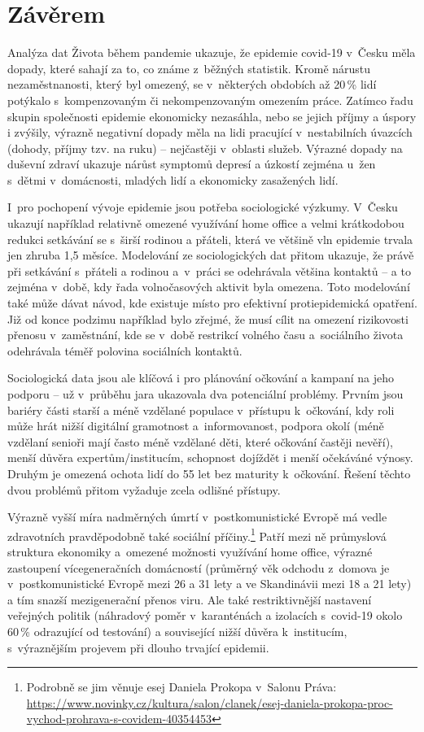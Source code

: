 \section*{Závěrem}

Analýza dat Života během pandemie ukazuje, že epidemie covid-19 v Česku měla dopady, které sahají za to, co známe z běžných statistik. Kromě nárustu nezaměstnanosti, který byl omezený, se v některých obdobích až 20\,\% lidí potýkalo s kompenzovaným či nekompenzovaným omezením práce. Zatímco řadu skupin společnosti epidemie ekonomicky nezasáhla, nebo se jejich příjmy a úspory i zvýšily, výrazně negativní dopady měla na lidi pracující v nestabilních úvazcích (dohody, příjmy tzv. na ruku) – nejčastěji v oblasti služeb. Výrazné dopady na duševní zdraví ukazuje nárůst symptomů depresí a úzkostí zejména u~žen s dětmi v domácnosti, mladých lidí a ekonomicky zasažených lidí.

I~pro pochopení vývoje epidemie jsou potřeba sociologické výzkumy. V Česku ukazují například relativně omezené využívání home office a velmi krátkodobou redukci setkávání se s širší rodinou a přáteli, která ve většině vln epidemie trvala jen zhruba 1,5 měsíce. Modelování ze sociologických dat přitom ukazuje, že právě při setkávání s přáteli a rodinou a v práci se odehrávala většina kontaktů – a to zejména v době, kdy řada volnočasových aktivit byla omezena. Toto modelování také může dávat návod, kde existuje místo pro efektivní protiepidemická opatření. Již od konce podzimu například bylo zřejmé, že musí cílit na omezení rizikovosti přenosu v zaměstnání, kde se v době restrikcí volného času a sociálního života odehrávala téměř polovina sociálních kontaktů.

Sociologická data jsou ale klíčová i pro plánování očkování a kampaní na jeho podporu – už v průběhu jara ukazovala dva potenciální problémy. Prvním jsou bariéry části starší a méně vzdělané populace v přístupu k očkování, kdy roli může hrát nižší digitální gramotnost a informovanost, podpora okolí (méně vzdělaní senioři mají často méně vzdělané děti, které očkování častěji nevěří), menší důvěra expertům/institucím, schopnost dojíždět i menší očekáváné výnosy. Druhým je omezená ochota lidí do 55 let bez maturity k očkování. Řešení těchto dvou problémů přitom vyžaduje zcela odlišné přístupy.

Výrazně vyšší míra nadměrných úmrtí v postkomunistické Evropě má vedle zdravotních pravděpodobně také sociální příčiny.\footnote{Podrobně se jim věnuje esej Daniela Prokopa v~Salonu Práva: \url{https://www.novinky.cz/kultura/salon/clanek/esej-daniela-prokopa-proc-vychod-prohrava-s-covidem-40354453}} Patří mezi ně průmyslová struktura ekonomiky a omezené možnosti využívání home office, výrazné zastoupení vícegeneračních domácností (průměrný věk odchodu z domova je v postkomunistické Evropě mezi 26 a 31 lety a ve Skandinávii mezi 18 a 21 lety) a tím snazší mezigenerační přenos viru. Ale také restriktivnější nastavení veřejných politik (náhradový poměr v karanténách a izolacích s covid-19 okolo 60\,\% odrazující od testování) a související nižší důvěra k~institucím, s~výraznějším projevem při dlouho trvající epidemii.

